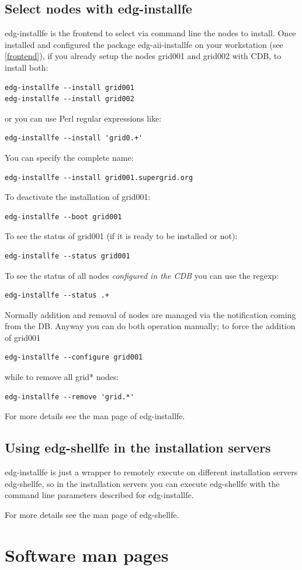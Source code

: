 \documentclass{datagridreport}
\begin{document}
\section{Select nodes with edg-installfe}
edg-installfe is the frontend to select via command line the nodes to install.
Once installed and configured the package edg-aii-installfe on your
workstation (see \ref{frontend}), if you already setup the nodes grid001 and grid002
with CDB, to install both:
\begin{verbatim}
edg-installfe --install grid001
edg-installfe --install grid002
\end{verbatim}
or you can use Perl regular expressions like:
\begin{verbatim}
edg-installfe --install 'grid0.+'
\end{verbatim}
You can specify the complete name:
\begin{verbatim}
edg-installfe --install grid001.supergrid.org
\end{verbatim}
To deactivate the installation of grid001:
\begin{verbatim}
edg-installfe --boot grid001
\end{verbatim}
To see the status of grid001 (if it is ready to be installed or not):
\begin{verbatim}
edg-installfe --status grid001
\end{verbatim}
To see the status of all nodes \emph{configured in the CDB} you can use the regexp:
\begin{verbatim}
edg-installfe --status .+
\end{verbatim}
Normally addition and removal of nodes are managed via the notification coming from
the  DB. Anyway you can do both operation manually; to force the addition of grid001
\begin{verbatim}
edg-installfe --configure grid001
\end{verbatim}
while to remove all grid* nodes:
\begin{verbatim}
edg-installfe --remove 'grid.*'
\end{verbatim}

For more details see the man page of edg-installfe.

\section{Using edg-shellfe in the installation servers} %
edg-installfe is just a wrapper to remotely execute on different installation servers
edg-shellfe, so in the installation servers you can execute edg-shellfe with the
command line parameters described for edg-installfe.

For more details see the man page of edg-shellfe.

\chapter{Software man pages}
\label{edg-dhcp}

\label{edg-nbp}

\label{edg-osinstall}

\label{edg-shellfe}

\label{edg-installfe}

\end{document}
